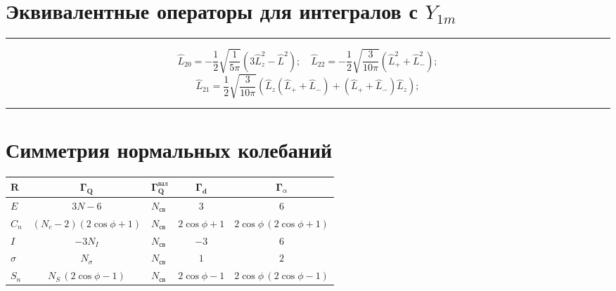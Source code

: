 \section{Эквивалентные операторы для интегралов с \texorpdfstring{$\textit{Y}_{1m}$}{|1 m>}}
\rule{\textwidth}{0.4pt}
\[ \widehat L_{20} = -\frac{1}{2}\sqrt{\frac{1}{5\pi}}\left(3\widehat L_z^2-\widehat L^2\right); \quad \widehat L_{22} =-\frac{1}{2}\sqrt{\frac{3}{10\pi}} \left( \widehat L_+^2 + \widehat L_-^2  \right);\]\hspace{\parindent}
\[ \widehat L_{21} = \frac{1}{2}\sqrt{\frac{3}{10\pi}}\left(\widehat L_z (\widehat L_+ + \widehat L_-)+(\widehat L_+ + \widehat L_-) \widehat L_z\right);\]
\rule{\textwidth}{0.4pt}


\section{Симметрия нормальных колебаний}
\vspace{0.4cm}

\begin{center}
\begin{tabular}{ |C{1cm}|c|C{1cm}|c|c| }
 \hline
 $\mathbf{R}$ & $\mathbf{\Gamma_Q}$  & $\mathbf{\Gamma_Q^{\text{вал}}}$ & $\mathbf{\Gamma_d}$ & $\mathbf{\Gamma}$\boldmath$_\alpha$\\[0.35ex]
 \hline\hline
 $E$ & $3N-6$ & $N_{\text{св}}$ & $3$ & $6$ \\[0.35ex]  
 \hline
 $C_n$ & $(N_c-2)(2\cos \phi+1)$ & $N_{\text{св}}$ & $2\cos\phi+1$ & $2\cos\phi\,(2\cos\phi+1)$ \\[0.35ex]
 \hline
 $I$ & $-3N_I$ & $N_{\text{св}}$ & $-3$ & $6$ \\[0.35ex]
 \hline
 $\sigma$ & $N_\sigma$ & $N_{\text{св}}$ & $1$ & $2$ \\[0.35ex]
 \hline
 $S_n$ & $N_S\,(2\cos \phi-1)$ & $N_{\text{св}}$ &$2\cos\phi-1$ & $2\cos\phi\,(2\cos\phi-1)$ \\[0.35ex]
 \hline
\end{tabular}
\end{center}

